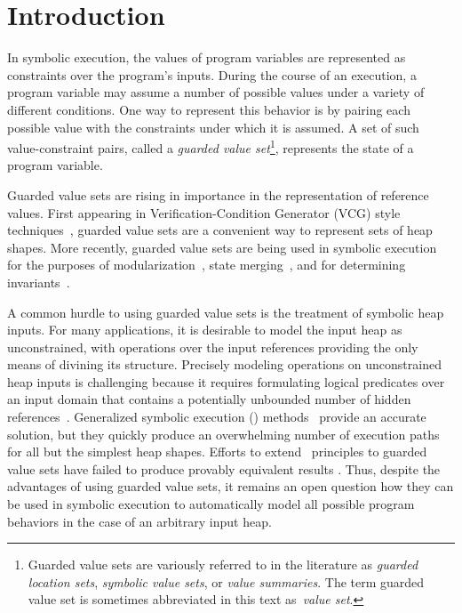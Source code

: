 \section{Introduction}




%

In symbolic execution, the values of program variables are represented as constraints over the program's inputs. During the course of an execution, a program variable may assume a number of possible values under a variety of different conditions. One way to represent this behavior is by pairing each possible value with the constraints under which it is assumed. A set of such value-constraint pairs, called a \emph{guarded value set}\footnote{Guarded value sets are variously referred to in the literature as \emph{guarded location sets}, \emph{symbolic value sets}, or \emph{value summaries}. The term guarded value set is sometimes abbreviated in this text as~\emph{value set}.}, represents the state of a program variable.

Guarded value sets are rising in importance in the representation of reference values. First appearing in Verification-Condition Generator (VCG) style techniques~\cite{Xie:2005,Dillig:2011}, guarded value sets are a convenient way to represent sets of heap shapes. More recently, guarded value sets are being used in symbolic execution for the purposes of modularization~\cite{Yorsh:2008}, state merging~\cite{Sen:2014}, and for determining invariants~\cite{Ferrara:2014,Torlak:2014}.

A common hurdle to using guarded value sets is the treatment of symbolic heap inputs. For many applications, it is desirable to model the input heap as unconstrained, with operations over the input references providing the only means of divining its structure. Precisely modeling operations on unconstrained heap inputs is challenging because it requires formulating logical predicates over an input domain that contains a potentially unbounded number of hidden references~\cite{Chen:2013,Qu:2011}. Generalized symbolic execution (\gsetxt{}) methods~\cite{GSE03,Deng:2007} provide an accurate solution, but they quickly produce an overwhelming number of execution paths for all but the simplest heap shapes. Efforts to extend~\gsetxt{} principles to guarded value sets have failed to produce provably equivalent results \cite{LISTEFFORTS}. Thus, despite the advantages of using guarded value sets, it remains an open question how they can be used in symbolic execution to automatically model all possible program behaviors in the case of an arbitrary input heap.

